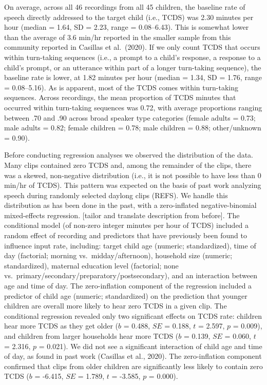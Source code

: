 \documentclass[
  english,
  ,man,floatsintext]{apa6}
\begin{document}
On average, across all 46 recordings from all 45 children, the baseline rate of speech directly addressed to the target child (i.e., TCDS) was 2.30 minutes per hour (median = 1.64, SD = 2.23, range = 0.08--6.43). This is somewhat lower than the average of 3.6 min/hr reported in the smaller sample from this community reported in Casillas et al.~(2020). If we only count TCDS that occurs within turn-taking sequences (i.e., a prompt to a child's response, a response to a child's prompt, or an utterance within part of a longer turn-taking sequence), the baseline rate is lower, at 1.82 minutes per hour (median = 1.34, SD = 1.76, range = 0.08--5.16). As is apparent, most of the TCDS comes within turn-taking sequences. Across recordings, the mean proportion of TCDS minutes that occurred within turn-taking sequences was 0.72, with average proportions ranging between .70 and .90 across broad speaker type categories (female adults = 0.73; male adults = 0.82; female children = 0.78; male children = 0.88; other/unknown = 0.90).

Before conducting regression analyses we observed the distribution of the data. Many clips contained zero TCDS and, among the remainder of the clips, there was a skewed, non-negative distribution (i.e., it is not possible to have less than 0 min/hr of TCDS). This pattern was expected on the basis of past work analyzing speech during randomly selected daylong clips (REFS). We handle this distribution as has been done in the past, with a zero-inflated negative-binomial mixed-effects regression. {[}tailor and translate description from before{]}. The conditional model (of non-zero integer minutes per hour of TCDS) included a random effect of recording and predictors that have previously been found to influence input rate, including: target child age (numeric; standardized), time of day (factorial; morning vs.~midday/afternoon), household size (numeric; standardized), maternal education level (factorial; none vs.~primary/secondary/preparatory/postsecondary), and an interaction between age and time of day. The zero-inflation component of the regression included a predictor of child age (numeric; standardized) on the prediction that younger children are overall more likely to hear zero TCDS in a given clip. The conditional regression revealed only two significant effects on TCDS rate: children hear more TCDS as they get older (\(b\) = 0.488, \(SE\) = 0.188, \(t\) = 2.597, \(p\) = 0.009), and children from larger households hear more TCDS (\(b\) = 0.139, \(SE\) = 0.060, \(t\) = 2.316, \(p\) = 0.021). We did not see a significant interaction of child age and time of day, as found in past work (Casillas et al., 2020). The zero-inflation component confirmed that clips from older children are significantly less likely to contain zero TCDS (\(b\) = -6.415, \(SE\) = 1.789, \(t\) = -3.585, \(p\) = 0.000).
\end{document}
